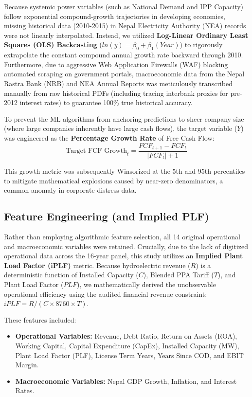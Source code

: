 \documentclass[11pt,a4paper]{article}
\begin{document}
Because systemic power variables (such as National Demand and IPP Capacity) follow exponential compound-growth trajectories in developing economies, missing historical data (2010-2015) in Nepal Electricity Authority (NEA) records were not linearly interpolated. Instead, we utilized \textbf{Log-Linear Ordinary Least Squares (OLS) Backcasting} ($ln(y) = \beta_0 + \beta_1(Year)$) to rigorously extrapolate the constant compound annual growth rate backward through 2010. Furthermore, due to aggressive Web Application Firewalls (WAF) blocking automated scraping on government portals, macroeconomic data from the Nepal Rastra Bank (NRB) and NEA Annual Reports was meticulously transcribed manually from raw historical PDFs (including tracing interbank proxies for pre-2012 interest rates) to guarantee 100\% true historical accuracy.

To prevent the ML algorithms from anchoring predictions to sheer company size (where large companies inherently have large cash flows), the target variable ($Y$) was engineered as the \textbf{Percentage Growth Rate} of Free Cash Flow:
\begin{equation}
\text{Target FCF Growth}_t = \frac{FCF_{t+1} - FCF_t}{|FCF_t| + 1}
\end{equation}

This growth metric was subsequently Winsorized at the 5th and 95th percentiles to mitigate mathematical explosions caused by near-zero denominators, a common anomaly in corporate distress data.

\subsection{Feature Engineering (and Implied PLF)}
Rather than employing algorithmic feature selection, all 14 original operational and macroeconomic variables were retained. Crucially, due to the lack of digitized operational data across the 16-year panel, this study utilizes an \textbf{Implied Plant Load Factor (iPLF)} metric. Because hydroelectric revenue ($R$) is a deterministic function of Installed Capacity ($C$), Blended PPA Tariff ($T$), and Plant Load Factor ($PLF$), we mathematically derived the unobservable operational efficiency using the audited financial revenue constraint: $iPLF = R / (C \times 8760 \times T)$. 

These features included:
\begin{itemize}
    \item \textbf{Operational Variables:} Revenue, Debt Ratio, Return on Assets (ROA), Working Capital, Capital Expenditure (CapEx), Installed Capacity (MW), Plant Load Factor (PLF), License Term Years, Years Since COD, and EBIT Margin.
    \item \textbf{Macroeconomic Variables:} Nepal GDP Growth, Inflation, and Interest Rates.
\end{itemize}
\end{document}
